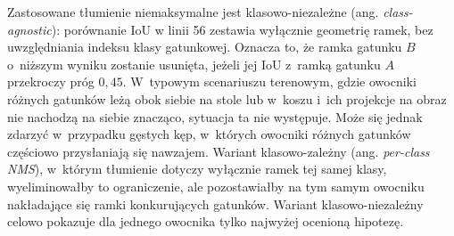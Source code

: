Zastosowane tłumienie niemaksymalne jest klasowo-niezależne (ang. \textit{class-agnostic}): porównanie $\mathrm{IoU}$ w linii 56 zestawia wyłącznie geometrię ramek, bez uwzględniania indeksu klasy gatunkowej. Oznacza to, że ramka gatunku $B$ o~niższym wyniku zostanie usunięta, jeżeli jej $\mathrm{IoU}$ z~ramką gatunku $A$ przekroczy próg $0{,}45$. W~typowym scenariuszu terenowym, gdzie owocniki różnych gatunków leżą obok siebie na stole lub w~koszu i~ich projekcje na obraz nie nachodzą na siebie znacząco, sytuacja ta nie występuje. Może się jednak zdarzyć w~przypadku gęstych kęp, w~których owocniki różnych gatunków częściowo przysłaniają się nawzajem. Wariant klasowo-zależny (ang. \textit{per-class NMS}), w~którym tłumienie dotyczy wyłącznie ramek tej samej klasy, wyeliminowałby to ograniczenie, ale pozostawiałby na tym samym owocniku nakładające się ramki konkurujących gatunków. Wariant klasowo-niezależny celowo pokazuje dla jednego owocnika tylko najwyżej ocenioną hipotezę.

